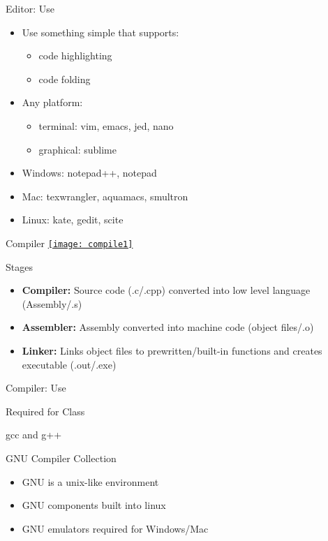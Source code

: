 \documentclass[xcolor={dvipsnames}]{beamer}
\begin{document}
\begin{frame}{Editor: Use}
	\begin{itemize}
	\item Use something simple that supports:
		\begin{itemize}
			\item code highlighting
			\item code folding
		\end{itemize}
	\pause
		\item Any platform:
		\begin{itemize} 
			\item terminal: vim, emacs, jed, nano
			\item graphical: sublime
		\end{itemize}
	\pause
		\item Windows: notepad++, notepad
		\item Mac: texwrangler, aquamacs, smultron
		\item Linux: kate, gedit, scite
	\end{itemize}
\end{frame}

\begin{frame}{Compiler}
		\href{http://krnlpanic.com/wp/c-compiler-basics/}{\texttt{[image: compile1]}}
		\pause
		\begin{block}{Stages}
		\begin{itemize}
			\item \textbf{Compiler:} Source code (.c/.cpp) converted into low level language (Assembly/.s)
			\pause
			\item \textbf{Assembler:} Assembly converted into machine code (object files/.o)
			\pause
			\item \textbf{Linker:} Links object files to prewritten/built-in functions and creates executable (.out/.exe)
		\end{itemize}
		\end{block}
\end{frame}

\begin{frame}{Compiler: Use}
	\begin{block}{Required for Class}
		\begin{center}
			gcc and  g++
		\end{center}
	\end{block}
	\pause
	\begin{block}{GNU Compiler Collection}
		\begin{itemize}
			\item GNU is a unix-like environment
			\item GNU components built into linux
			\item GNU emulators required for Windows/Mac
		\end{itemize}
	\end{block}
\end{frame}
\end{document}
